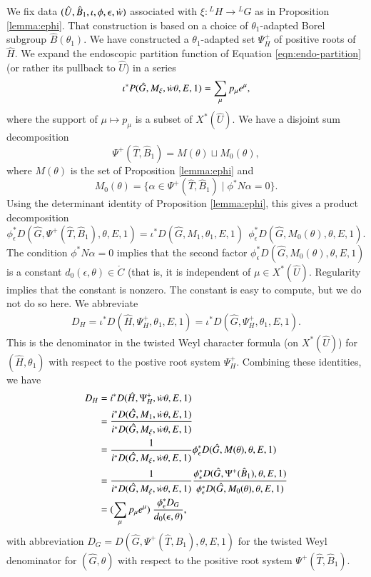 We fix data $(\hat U,\hat B_1,\iota,\phi,\epsilon,\dot w)$ associated with
$\xi:{}^LH\to{}^LG$ as in Proposition \ref{lemma:ephi}.  That
construction is based on a choice of $\theta_1$-adapted Borel subgroup
$\hat B(\theta_1)$.  We have constructed a $\theta_1$-adapted set
$\Psi^+_H$ of positive roots of $\hat H$.  We expand the endoscopic
partition function of Equation \ref{eqn:endo-partition} (or rather its
pullback to $\hat U$) in a series
\begin{equation}
\iota^* P(\hat G,M_\xi,\dot w\theta,E,1) = \sum_{\mu} p_\mu e^\mu,
\end{equation}
where the support of $\mu\mapsto p_\mu$ is a subset of $X^*(\hat U)$.  We have a
disjoint sum decomposition 
\[
\Psi^+(\hat T,\hat B_1) = M(\theta)\sqcup M_0(\theta),
\]
where $M(\theta)$ is the set of Proposition \ref{lemma:ephi} and
\[
M_0(\theta) = \{\alpha\in \Psi^+(\hat T,\hat B_1)\mid \phi^* N\alpha=0\}.
\]
Using the determinant identity of 
Proposition \ref{lemma:ephi}, this gives a product decomposition
\begin{equation}
\phi^*_\epsilon D(\hat G,\Psi^+(\hat T,\hat B_1),\theta,E,1) = 
\iota^* D(\hat G,M_1,\theta_1,E,1) \ \ 
\phi^*_\epsilon D(\hat G,M_0(\theta),\theta,E,1).
\end{equation}
The condition $\phi^* N\alpha=0$ implies that 
the second factor $\phi^*_\epsilon D(\hat G,M_0(\theta),\theta,E,1)$
is a constant $d_0(\epsilon,\theta)\in\ring{C}$ (that is, it is
independent of $\mu\in X^*(\hat U)$.  Regularity implies that 
the constant is nonzero.  The constant is easy to compute, but we  do not do so here.
We abbreviate
\begin{align*}
D_H = \iota^* D(\hat H,\Psi^+_H,\theta_1,E,1) = \iota^* D(\hat G,\Psi^+_H,\theta_1,E,1).
\end{align*}
This is the denominator in the twisted Weyl character formula (on
$X^*(\hat U)$) for $(\hat H,\theta_1)$
with respect to the postive root system $\Psi^+_H$.
Combining these identities, we have
\begin{align}\label{eqn:DHDG}
\begin{split}
D_H &= i^* D(\hat H,\Psi^+_H,\dot w\theta,E,1)\\
&=\frac{i^*D(\hat G,M_1,\dot w\theta,E,1)}
{i^*D(\hat G,M_\xi,\dot w\theta,E,1)}\\
&=\frac{1}
{i^*D(\hat G,M_\xi,\dot w\theta,E,1)}
\phi^*_\epsilon D(\hat G,M(\theta),\theta,E,1)\\
&=\frac{1}
{i^*D(\hat G,M_\xi,\dot w\theta,E,1)}
\frac{\phi^*_\epsilon D(\hat G,\Psi^+(\hat B_1),\theta,E,1)}
{\phi^*_\epsilon D(\hat G,M_0(\theta),\theta,E,1)}\\
&=
(\sum_{\mu} p_\mu e^\mu) 
\ \frac{\phi^*_\epsilon D_G}{
d_0(\epsilon,\theta)},
\end{split}
\end{align}
with abbreviation $D_G= D(\hat G,\Psi^+(\hat T,\hat B_1),\theta,E,1)$ for
the twisted Weyl denominator for $(\hat G,\theta)$ with respect to the positive
root system $\Psi^+(\hat T,\hat B_1)$.

